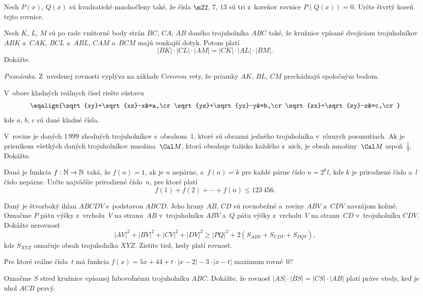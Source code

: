﻿{%
Nech $P(x)$, $Q(x)$ sú kvadratické mnohočleny také, že čísla $\m22$, $7$, $13$
sú tri z~koreňov rovnice $P\left(Q(x)\right)=0$.
Určte štvrtý koreň tejto rovnice.}

{%
Nech $K$, $L$, $M$ sú po rade vnútorné body strán $BC$, $C\!A$,
$AB$ daného trojuholníka $ABC$ také, že kružnice vpísané
dvojiciam trojuholníkov  $ABK$ a~$C\!AK$, $BC\!L$ a~$ABL$, $C\!AM$
a~$BC\!M$ majú vonkajší dotyk. Potom platí
$$
|BK|\cdot|CL|\cdot|AM|=|CK|\cdot|AL|\cdot|BM|.
$$
Dokážte.

\noindent%
{\it Poznámka}. Z~uvedenej rovnosti vyplýva na základe Cevovou
vety, že priamky $AK$, $BL$, $CM$ prechádzajú spoločným bodom.}

{%
V~obore kladných reálnych čísel riešte sústavu
$$
\eqalign{\sqrt{xy}+\sqrt{xz}-x&=a,\cr
         \sqrt{yz}+\sqrt{yx}-y&=b,\cr
         \sqrt{zx}+\sqrt{zy}-z&=c,\cr}
$$
kde $a$, $b$, $c$ sú dané kladné čísla.}

{%
V~rovine je daných 1\,999 zhodných trojuholníkov s~obsahom~$1$, ktoré
sú obrazmi jedného trojuholníka v~rôznych posunutiach.
Ak je prienikom všetkých daných trojuholníkov množina~$\Cal M$,
ktorá obsahuje ťažisko každého z~nich, je
obsah množiny~$\Cal M$ aspoň~$\frac19$. Dokážte.}

{%
Daná je funkcia $f:\Bbb N\to\Bbb N$ taká, že $f(n)=1$, ak je $n$
nepárne, a~$f(n)=k$ pre každé párne číslo $n=2^k l$, kde $k$ je
prirodzené číslo a~$l$ číslo nepárne.
Určte najväčšie prirodzené číslo~$n$, pre ktoré platí
$$
f(1)+f(2)+\cdots+f(n)\leq 123\,456.
$$}

{%
Daný je štvorboký ihlan $ABC\!DV$ s~podstavou $ABC\!D$. Jeho hrany
$AB$, $C\!D$ sú rovnobežné a~roviny $ABV$ a~$C\!DV$
navzájom kolmé. Označme $P$
pätu výšky z~vrcholu~$V$ na  stranu~$AB$ v~trojuholníku $ABV$
a~$Q$ pätu výšky z~vrcholu~$V$ na stranu~$C\!D$
v~trojuholníku $C\!DV$. Dokážte nerovnosť
$$
|AV|^2+|BV|^2+|CV|^2+|DV|^2\geq
|PQ|^2+2(S_{ABV}+S_{C\!DV}+S_{PQV}),
$$
kde $S_{XY\!Z}$ označuje obsah trojuholníka $XY\!Z$. Zistite tiež,
kedy platí rovnosť.}

{%
Pre ktoré reálne čísla~$t$  má  funkcia
$f(x)=5x+44+t\cdot|x-2|- 3\cdot|x-t|$
maximum rovné~0?}

{%
Označme $S$ stred kružnice vpísanej ľubovoľnému trojuholníku
$ABC$. Dokážte, že rovnosť $|AS|\cdot|BS|=|CS|\cdot|AB|$ platí
práve vtedy, keď je uhol $AC\!B$ pravý.}

